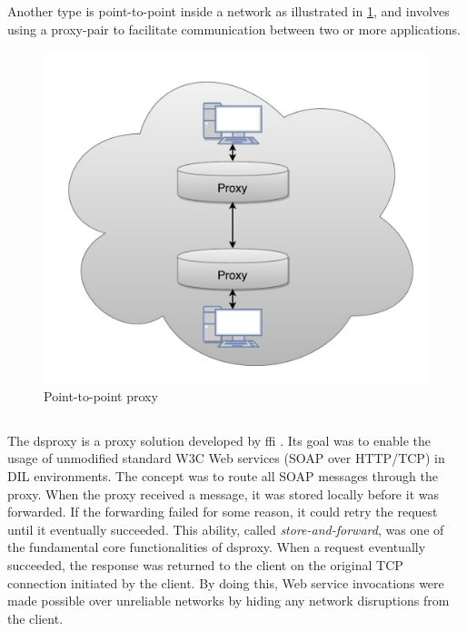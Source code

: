 Another type is point-to-point inside a network as illustrated in
\cref{figure:proxy-point}, and involves using a proxy-pair to facilitate communication
between two or more applications.

\begin{figure}[h]
\includegraphics[scale=0.35]{images/proxy_point.pdf}
\caption{Point-to-point proxy}
\label{figure:proxy-point}
\end{figure}

\subsection{}

The \gls{dsproxy} is a proxy solution developed by \gls{ffi}
\cite{dsproxy-ffi}\cite{ieee-dsproxy}. Its goal was to enable the usage of
unmodified standard W3C Web services (SOAP over HTTP/TCP) in DIL environments.
The concept was to route all SOAP messages through the proxy. When the proxy
received a message, it was stored locally before it was forwarded. If the
forwarding failed for some reason, it could retry the request until it
eventually succeeded. This ability, called \textit{store-and-forward}, was one
of the fundamental core functionalities of \gls{dsproxy}. When a request
eventually succeeded, the response was returned to the client on the original
TCP connection initiated by the client. By doing this, Web service invocations
were made possible over unreliable networks by hiding any network disruptions
from the client.


